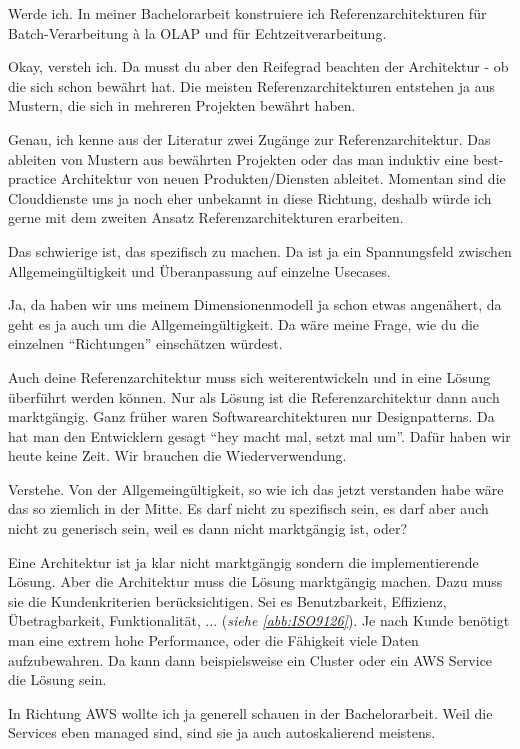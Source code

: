 \LF Werde ich. In meiner Bachelorarbeit konstruiere ich Referenzarchitekturen für Batch-Verarbeitung \`{a} la \ac{OLAP} und für Echtzeitverarbeitung.

\RB Okay, versteh ich. Da musst du aber den Reifegrad beachten der Architektur - ob die sich schon bewährt hat. Die meisten Referenzarchitekturen entstehen ja aus Mustern, die sich in mehreren Projekten bewährt haben.

\LF Genau, ich kenne aus der Literatur zwei Zugänge zur Referenzarchitektur. Das ableiten von Mustern aus bewährten Projekten oder das man induktiv eine best-practice Architektur von neuen Produkten/Diensten ableitet. Momentan sind die Clouddienste uns ja noch eher unbekannt in diese Richtung, deshalb würde ich gerne mit dem zweiten Ansatz Referenzarchitekturen erarbeiten.

\RB Das schwierige ist, das spezifisch zu machen. Da ist ja ein Spannungsfeld zwischen Allgemeingültigkeit und Überanpassung auf einzelne Usecases.

\LF Ja, da haben wir uns meinem Dimensionenmodell ja schon etwas angenähert, da geht es ja auch um die Allgemeingültigkeit. Da wäre meine Frage, wie du die einzelnen \enquote{Richtungen} einschätzen würdest.

\RB Auch deine Referenzarchitektur muss sich weiterentwickeln und in eine Lösung überführt werden können. Nur als Lösung ist die Referenzarchitektur dann auch marktgängig. Ganz früher waren Softwarearchitekturen nur Designpatterns. Da hat man den Entwicklern gesagt \enquote{hey macht mal, setzt mal um}. Dafür haben wir heute keine Zeit. Wir brauchen die Wiederverwendung. 

\LF Verstehe. Von der Allgemeingültigkeit, so wie ich das jetzt verstanden habe wäre das so ziemlich in der Mitte. Es darf nicht zu spezifisch sein, es darf aber auch nicht zu generisch sein, weil es dann nicht marktgängig ist, oder?

\RB Eine Architektur ist ja klar nicht marktgängig sondern die implementierende Lösung. Aber die Architektur muss die Lösung marktgängig machen. Dazu muss sie die Kundenkriterien berücksichtigen. Sei es Benutzbarkeit, Effizienz, Übetragbarkeit, Funktionalität, ... (\textit{siehe \autoref{abb:ISO9126}}). Je nach Kunde benötigt man eine extrem hohe Performance, oder die Fähigkeit viele Daten aufzubewahren. Da kann dann beispielsweise ein Cluster oder ein \ac{AWS} Service die Lösung sein.

\LF In Richtung \ac{AWS} wollte ich ja generell schauen in der Bachelorarbeit. Weil die Services eben managed sind, sind sie ja auch autoskalierend meistens.

